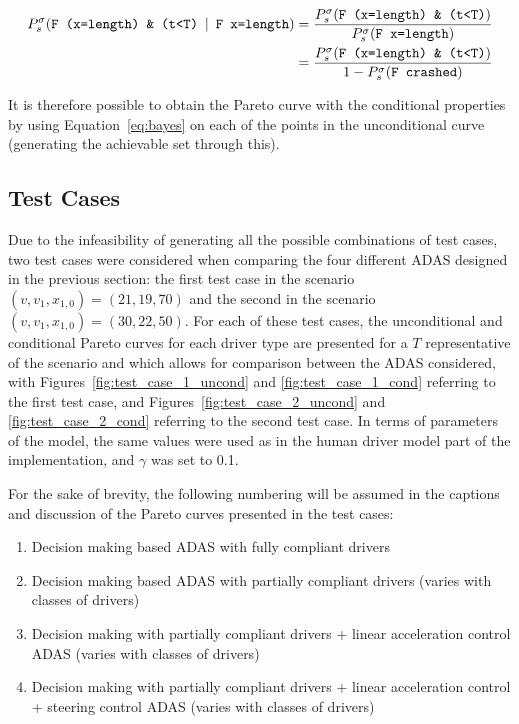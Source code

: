 \begin{equation}
\label{eq:bayes}
\begin{aligned}
	P^{\sigma}_s (\text{\texttt{F (x=length) \& (t<T)}} \:\mid\: \text{\texttt{F x=length}}) & = \frac{P^{\sigma}_s (\text{\texttt{F (x=length) \& (t<T)}})}{P^{\sigma}_s (\text{\texttt{F x=length}})} \\
	&  = \frac{P^{\sigma}_s (\text{\texttt{F (x=length) \& (t<T)}})}{1 - P^{\sigma}_s (\text{\texttt{F crashed}})}
\end{aligned}
\end{equation}

It is therefore possible to obtain the Pareto curve with the conditional properties by using Equation~\ref{eq:bayes} on each of the points in the unconditional curve (generating the achievable set through this).

\subsection{Test Cases}

Due to the infeasibility of generating all the possible combinations of test cases, two test cases were considered when comparing the four different ADAS designed in the previous section: the first test case in the scenario $(v, v_1, x_{1,0}) = (21, 19, 70)$ and the second in the scenario $(v, v_1, x_{1,0}) = (30, 22, 50)$. For each of these test cases, the unconditional and conditional Pareto curves for each driver type are presented for a $T$ representative of the scenario and which allows for comparison between the ADAS considered, with Figures~\ref{fig:test_case_1_uncond} and \ref{fig:test_case_1_cond} referring to the first test case, and Figures~\ref{fig:test_case_2_uncond} and \ref{fig:test_case_2_cond} referring to the second test case. In terms of parameters of the model, the same values were used as in the human driver model part of the implementation, and $\gamma$ was set to 0.1.

For the sake of brevity, the following numbering will be assumed in the captions and discussion of the Pareto curves presented in the test cases:

\begin{enumerate}
	\item Decision making based ADAS with fully compliant drivers
	\item Decision making based ADAS with partially compliant drivers (varies with classes of drivers)
	\item Decision making with partially compliant drivers + linear acceleration control ADAS (varies with classes of drivers)
	\item Decision making with partially compliant drivers + linear acceleration control + steering control ADAS (varies with classes of drivers)
\end{enumerate}

